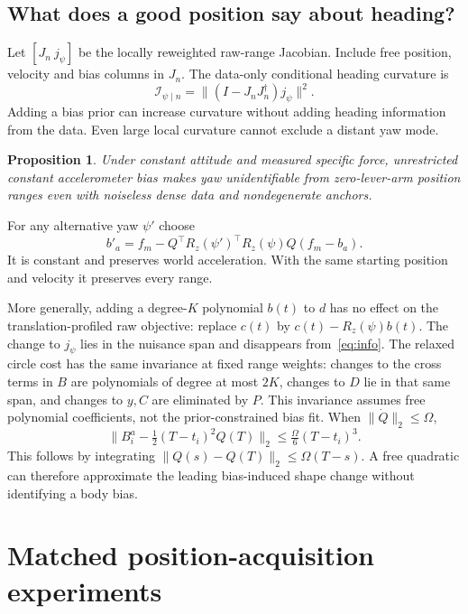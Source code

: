 \documentclass[conference,letterpaper,10pt]{IEEEtran}
\newcommand{\rz}{R_z}
\newtheorem{proposition}{Proposition}
\begin{document}
\subsection{What does a good position say about heading?}
Let $[J_n\ j_\psi]$ be the locally reweighted raw-range Jacobian. Include free position, velocity and bias columns in $J_n$. The data-only conditional heading curvature is
\begin{equation}
 \mathcal I_{\psi\mid n}=\|(I-J_nJ_n^\dagger)j_\psi\|^2 . \label{eq:info}
\end{equation}
Adding a bias prior can increase curvature without adding heading information from the data. Even large local curvature cannot exclude a distant yaw mode.
\begin{proposition}
Under constant attitude and measured specific force, unrestricted constant accelerometer bias makes yaw unidentifiable from zero-lever-arm position ranges even with noiseless dense data and nondegenerate anchors.
\end{proposition}
\begin{IEEEproof}
For any alternative yaw $\psi'$ choose
\begin{equation*}
b'_a=f_m-Q^\top\rz(\psi')^\top\rz(\psi)Q(f_m-b_a).
\end{equation*}
It is constant and preserves world acceleration. With the same starting position and velocity it preserves every range.
\end{IEEEproof}
More generally, adding a degree-$K$ polynomial $b(t)$ to $d$ has no effect on the translation-profiled raw objective: replace $c(t)$ by $c(t)-\rz(\psi)b(t)$. The change to $j_\psi$ lies in the nuisance span and disappears from~\eqref{eq:info}. The relaxed circle cost has the same invariance at fixed range weights: changes to the cross terms in $B$ are polynomials of degree at most $2K$, changes to $D$ lie in that same span, and changes to $y,C$ are eliminated by $P$. This invariance assumes free polynomial coefficients, not the prior-constrained bias fit. When $\|\dot Q\|_2\le\Omega$,
\begin{equation}
 \|B_i^a-\tfrac12(T-t_i)^2Q(T)\|_2\le\tfrac{\Omega}{6}(T-t_i)^3 . \label{eq:bound}
\end{equation}
This follows by integrating $\|Q(s)-Q(T)\|_2\le\Omega(T-s)$. A free quadratic can therefore approximate the leading bias-induced shape change without identifying a body bias.
\section{Matched position-acquisition experiments}
\end{document}
